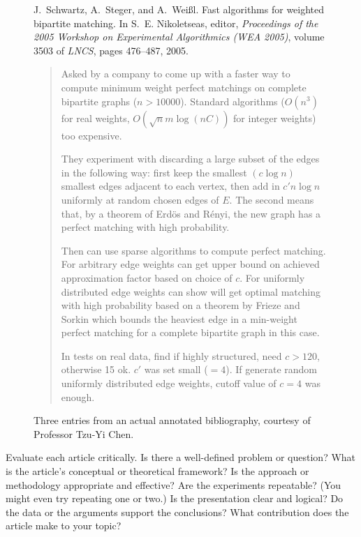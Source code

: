 \documentclass[finalcopy]{srpaper}
\begin{document}
\begin{figure}
\begin{center}
\begin{minipage}{0.9\textwidth}
\begin{thebibliography}{GJS76}
J.~Schwartz, A.~Steger, and A.~Wei\ss l.
\newblock Fast algorithms for weighted bipartite matching.
\newblock In S.~E. Nikoletseas, editor, {\em Proceedings of
  the 2005 Workshop on Experimental Algorithmics (WEA
  2005)}, volume 3503 of {\em LNCS}, pages 476--487, 2005.
\begin{quotation}\noindent
  Asked by a company to come up with a faster way to compute
  minimum weight perfect matchings on complete bipartite
  graphs ($n>10000$). Standard algorithms ($O(n^3)$ for real
  weights, $O(\sqrt{n}m\log(nC))$ for integer weights) too
  expensive.\par They experiment with discarding a large
  subset of the edges in the following way: first keep the
  smallest $(c\log n)$ smallest edges adjacent to each
  vertex, then add in $c' n\log n$ uniformly at random
  chosen edges of $E$. The second means that, by a theorem
  of Erd\"os and R\'enyi, the new graph has a perfect matching
  with high probability.\par Then can use sparse algorithms
  to compute perfect matching. For arbitrary edge weights
  can get upper bound on achieved approximation factor based
  on choice of $c$. For uniformly distributed edge weights
  can show will get optimal matching with high probability
  based on a theorem by Frieze and Sorkin which bounds the
  heaviest edge in a min-weight perfect matching for a
  complete bipartite graph in this case.\par In tests on
  real data, find if highly structured, need $c>120$,
  otherwise 15 ok. $c'$ was set small ($=4$). If generate
  random uniformly distributed edge weights, cutoff value of
  $c=4$ was enough.
\end{quotation}
\end{thebibliography}
\end{minipage}
\end{center}
\caption[Sample annotated bibliography]{Three entries from
an actual annotated bibliography, courtesy of Professor
Tzu-Yi Chen.}
\label{Figure:SampleAnnotatedBibliography}
\end{figure}

Evaluate each article critically. Is there a well-defined
problem or question? What is the article's conceptual or
theoretical framework? Is the approach or methodology
appropriate and effective? Are the experiments repeatable?
(You might even try repeating one or two.) Is the
presentation clear and logical? Do the data or the arguments
support the conclusions? What contribution does the article
make to your topic?
\end{document}
